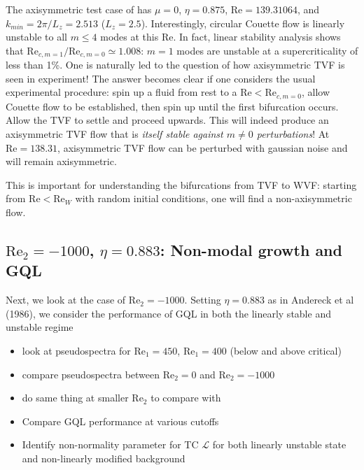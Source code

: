 \documentclass[openacc]{rstransa}%
\newcommand{\Reyn}{\mathrm{Re}}
\newcommand{\Lop}{\mathcal{L}}
\begin{document}
The axisymmetric test case of \cite{1984JFM...146...65M} has $\mu = 0$, $\eta = 0.875$, $\Reyn = 139.31064$, and $k_{min} = 2\pi/L_z = 2.513$ ($L_z = 2.5$). Interestingly, circular Couette flow is linearly unstable to all $m \leq 4$ modes at this $\Reyn$. 
In fact, linear stability analysis shows that $\Reyn_{c,m=1}/\Reyn_{c, m=0} \simeq 1.008$: $m=1$ modes are unstable at a supercriticality of less than 1\%. 
One is naturally led to the question of how axisymmetric TVF is seen in experiment!
The answer becomes clear if one considers the usual experimental procedure: spin up a fluid from rest to a $\Reyn < \Reyn_{c,m=0}$, allow Couette flow to be established, then spin up until the first bifurcation occurs. Allow the TVF to settle and proceed upwards. This will indeed produce an axisymmetric TVF flow that is \emph{itself stable against $m\ne 0$ perturbations}! At $\Reyn = 138.31$, axisymmetric TVF flow can be perturbed with gaussian noise and will remain axisymmetric. 

This is important for understanding the bifurcations from TVF to WVF: starting from $\Reyn < \Reyn_{W}$ with random initial conditions, one will find a non-axisymmetric flow.

\subsection{$\Reyn_2 = -1000$, $\eta = 0.883$: Non-modal growth and GQL}
Next, we look at the case of $\Reyn_2 = -1000$. Setting $\eta = 0.883$ as in Andereck et al (1986), we consider the performance of GQL in both the linearly stable and unstable regime
\begin{itemize}
    \item look at pseudospectra for $\Reyn_1 = 450$, $\Reyn_1 = 400$ (below and above critical)
    \item compare pseudospectra between $\Reyn_2 = 0$ and $\Reyn_2 = -1000$
    \item do same thing at smaller $\Reyn_2$ to compare with \cite{2002PhFl...14.3475H}
    \item Compare GQL performance at various cutoffs
    \item Identify non-normality parameter for TC $\Lop$ for both linearly unstable state and non-linearly modified background
\end{itemize}
\end{document}
